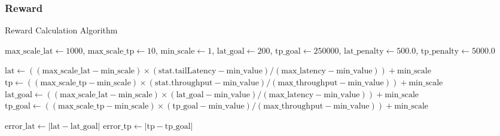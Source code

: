\subsubsection{Reward}

\begin{algorithm}[ht]
  \caption{Reward Calculation Algorithm}
  \label{algo:reward_calculation}
  \SetAlgoLined
  $\text{max\_scale\_lat} \leftarrow 1000$, $\text{max\_scale\_tp} \leftarrow 10$, $\text{min\_scale} \leftarrow 1$, $\text{lat\_goal} \leftarrow 200$, $\text{tp\_goal} \leftarrow 250000$, $\text{lat\_penalty} \leftarrow 500.0$, $\text{tp\_penalty} \leftarrow 5000.0$\;
    
  $\text{lat} \leftarrow ((\text{max\_scale\_lat} - \text{min\_scale}) \times (\text{stat.tailLatency} - \text{min\_value}) / (\text{max\_latency} - \text{min\_value})) + \text{min\_scale}$\;
  $\text{tp} \leftarrow ((\text{max\_scale\_tp} - \text{min\_scale}) \times (\text{stat.throughput} - \text{min\_value}) / (\text{max\_throughput} - \text{min\_value})) + \text{min\_scale}$\;
  $\text{lat\_goal} \leftarrow ((\text{max\_scale\_lat} - \text{min\_scale}) \times (\text{lat\_goal} - \text{min\_value}) / (\text{max\_latency} - \text{min\_value})) + \text{min\_scale}$\;
  $\text{tp\_goal} \leftarrow ((\text{max\_scale\_tp} - \text{min\_scale}) \times (\text{tp\_goal} - \text{min\_value}) / (\text{max\_throughput} - \text{min\_value})) + \text{min\_scale}$\;
    
  $\text{error\_lat} \leftarrow |\text{lat} - \text{lat\_goal}|$\;
  $\text{error\_tp} \leftarrow |\text{tp} - \text{tp\_goal}|$\;
    

\end{algorithm}

